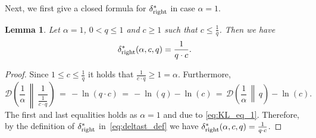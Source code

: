\documentclass[letterpaper,11pt]{article}
\newcommand{\1}[1]{\mathds{1}\left[#1\right]}
\newcommand{\D}[2]{\mathcal{D}\left(#1\, \middle\|\,#2 \right)}
\newtheorem{lemma}[theorem]{Lemma}
\newcommand{\sdeltar}{\delta^{*}_{\textnormal{right}}}
\begin{document}
Next, we  first give a closed formula for $\sdeltar$ in case $\alpha=1$. 

\begin{lemma}\label{lemma:sampling_2_approx_alpha_1}
	Let $\alpha = 1$,  $0 < q \leq 1$ and $c \geq 1$
	such that $c \leq \frac{1}{q}$.
	Then we have
	\begin{equation*}
		\sdeltar(\alpha, c, q) = \frac{1}{q \cdot c}.
	\end{equation*}
\end{lemma}
\begin{proof}
 Since $1\leq c\leq \frac{1}{q}$ it holds that $\frac{1}{c\cdot q} \geq 1 = \alpha$. Furthermore,
 $$
 \D{\frac{1}{\alpha}}{\frac{1}{\frac{1}{c\cdot q}}} \,=\,  -\ln(q\cdot c) \,=\, -\ln(q)-\ln(c) \,=\, \D{\frac{1}{\alpha}}{q} -\ln(c).  
  $$
  The first and last equalities holds as $\alpha=1$ and due to \eqref{eq:KL_eq_1}.  Therefore, by the definition of $\sdeltar$ in~\eqref{eq:deltast_def} we have $		\sdeltar(\alpha, c, q) = \frac{1}{q \cdot c}$. 
\end{proof}
\end{document}
